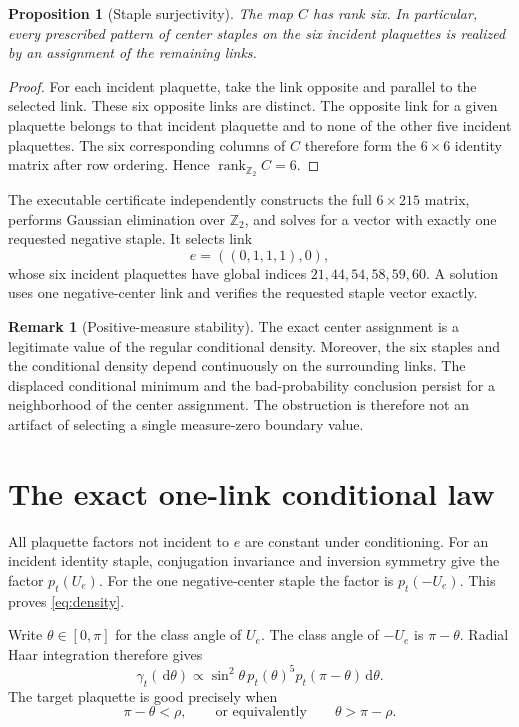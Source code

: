 \documentclass[11pt]{article}
\newtheorem{proposition}[theorem]{Proposition}
\theoremstyle{definition}
\newtheorem{remark}[theorem]{Remark}
\newcommand{\Ztwo}{\mathbb Z_2}
\newcommand{\dd}{\,\mathrm{d}}
\begin{document}
\begin{proposition}[Staple surjectivity]\label{prop:rank}
The map $C$ has rank six.  In particular, every prescribed pattern of center
staples on the six incident plaquettes is realized by an assignment of the
remaining links.
\end{proposition}

\begin{proof}
For each incident plaquette, take the link opposite and parallel to the
selected link.  These six opposite links are distinct.  The opposite link for
a given plaquette belongs to that incident plaquette and to none of the other
five incident plaquettes.  The six corresponding columns of $C$ therefore
form the $6\times6$ identity matrix after row ordering.  Hence
$\operatorname{rank}_{\Ztwo}C=6$.
\end{proof}

The executable certificate independently constructs the full $6\times215$
matrix, performs Gaussian elimination over $\Ztwo$, and solves for a vector
with exactly one requested negative staple.  It selects link
\[
 e=((0,1,1,1),0),
\]
whose six incident plaquettes have global indices
$21,44,54,58,59,60$.  A solution uses one negative-center link and verifies
the requested staple vector exactly.

\begin{remark}[Positive-measure stability]
The exact center assignment is a legitimate value of the regular conditional
density.  Moreover, the six staples and the conditional density depend
continuously on the surrounding links.  The displaced conditional minimum and
the bad-probability conclusion persist for a neighborhood of the center
assignment.  The obstruction is therefore not an artifact of selecting a
single measure-zero boundary value.
\end{remark}

\section{The exact one-link conditional law}\label{sec:law}

All plaquette factors not incident to $e$ are constant under conditioning.
For an incident identity staple, conjugation invariance and inversion symmetry
give the factor $p_t(U_e)$.  For the one negative-center staple the factor is
$p_t(-U_e)$.  This proves \eqref{eq:density}.

Write $\theta\in[0,\pi]$ for the class angle of $U_e$.  The class angle of
$-U_e$ is $\pi-\theta$.  Radial Haar integration therefore gives
\begin{equation}\label{eq:radial}
 \gamma_t(\dd\theta)\propto
 \sin^2\theta\,p_t(\theta)^5p_t(\pi-\theta)\dd\theta.
\end{equation}
The target plaquette is good precisely when
\[
 \pi-\theta<\rho,
 \qquad\text{or equivalently}\qquad
 \theta>\pi-\rho.
\]
\end{document}
